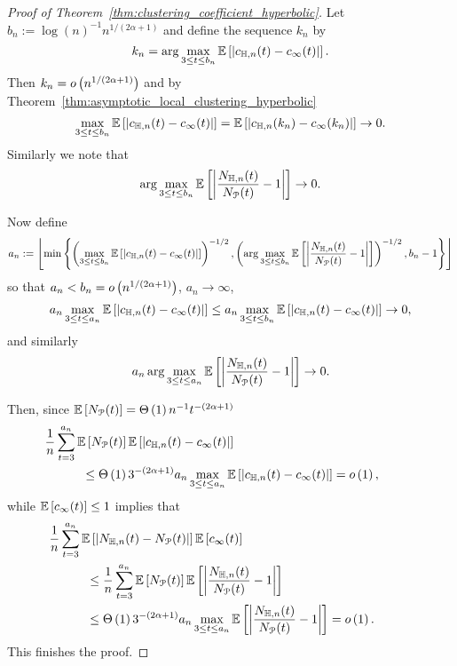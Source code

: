 \begin{proof}[Proof of Theorem~\ref{thm:clustering_coefficient_hyperbolic}]
Let $b_n := \log(n)^{-1} n^{1/(2\alpha + 1)}$ and define the sequence $k_n$ by
\[
	k_n = \arg \max_{3 \le t \le b_n} \mathbb{E}\left[\left|c_{\mathbb{H},n}(t) - c_{\infty}(t)\right|\right].
\]
Then $k_n = o\left(n^{1/(2\alpha + 1)}\right)$ and by Theorem~\ref{thm:asymptotic_local_clustering_hyperbolic}
\[
	\max_{3 \le t \le b_n} \mathbb{E}\left[\left|c_{\mathbb{H},n}(t) - c_{\infty}(t)\right|\right] = \mathbb{E}\left[\left|c_{\mathbb{H},n}(k_n) - c_{\infty}(k_n)\right|\right] \to 0.
\]
Similarly we note that
\[
	\arg \max_{3 \le t \le b_n} \mathbb{E}\left[\left|\frac{N_{\mathbb{H},n}(t)}{N_{{\mathcal P}}(t)} - 1\right|\right] \to 0.
\]

Now define
\[
	a_n := \left\lfloor \min \left\{
	\left(\max_{3 \le t \le b_n} \mathbb{E}\left[\left|c_{\mathbb{H},n}(t) - c_{\infty}(t)\right|\right]\right)^{-1/2},
	\left(\arg \max_{3 \le t \le b_n} \mathbb{E}\left[\left|\frac{N_{\mathbb{H},n}(t)}{N_{{\mathcal P}}(t)} - 1\right|\right]\right)^{-1/2},
	b_n - 1 \right\} \right\rfloor
\]
so that $a_n < b_n = o\left(n^{1/(2\alpha + 1)}\right)$, $a_n \to \infty$, 
\[
	a_n \max_{3 \le t \le a_n} \mathbb{E}\left[\left|c_{\mathbb{H},n}(t) - c_{\infty}(t)\right|\right] 
	\le a_n \max_{3 \le t \le b_n} \mathbb{E}\left[\left|c_{\mathbb{H},n}(t) - c_{\infty}(t)\right|\right] \to 0,
\]
and similarly
\[
	a_n \arg \max_{3 \le t \le a_n} \mathbb{E}\left[\left|\frac{N_{\mathbb{H},n}(t)}{N_{{\mathcal P}}(t)} - 1\right|\right] \to 0.
\]

Then, since $\mathbb{E}\left[N_{{\mathcal P}}(t)\right] = \Theta\left(1\right)n^{-1} t^{-(2\alpha + 1)}$
\begin{align*}
	&\hspace{-30pt}\frac{1}{n} \sum_{t = 3}^{a_n} \Exp{N_\Pcal(t)} \Exp{\left|c_{\H,n}(t) - c_{\infty}(t)\right|}\\
	&\le \bigT{1} 3^{-(2\alpha+1)} a_n \max_{3 \le t \le a_n} \Exp{\left|c_{\H,n}(t) - c_{\infty}(t)\right|}
	= \smallO{1},
\end{align*}
while $\mathbb{E}\left[c_\infty(t)\right] \le 1$ implies that
\begin{align*}
	&\hspace{-30pt}\frac{1}{n} \sum_{t = 3}^{a_n} \Exp{\left|N_{\H,n}(t) - N_\Pcal(t)\right|}\Exp{c_\infty(t)} \\
	&\le \frac{1}{n} \sum_{t = 3}^{a_n} \Exp{N_\Pcal(t)} \Exp{\left|\frac{N_{\H,n}(t)}{N_\Pcal(t)} - 1\right|} \\
	&\le \bigT{1} 3^{-(2\alpha+1)} a_n \max_{3 \le t \le a_n} \Exp{\left|\frac{N_{\H,n}(t)}{N_\Pcal(t)} - 1\right|} 
		= \smallO{1}.
\end{align*}
This finishes the proof.
\end{proof}
